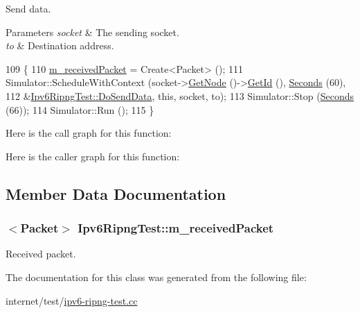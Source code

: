 Send data. 


\begin{DoxyParams}{Parameters}
{\em socket} & The sending socket. \\
\hline
{\em to} & Destination address. \\
\hline
\end{DoxyParams}

\begin{DoxyCode}
109 \{
110   \hyperlink{classIpv6RipngTest_a1fe2f673eabbd26e6fb0dd5f28ce72eb}{m\_receivedPacket} = Create<Packet> ();
111   Simulator::ScheduleWithContext (socket->\hyperlink{classns3_1_1Socket_aba642ad4301c1df47befc0aa9afa2e48}{GetNode} ()->\hyperlink{classns3_1_1Node_aaf49b64a843565ce3812326313b370ac}{GetId} (), 
      \hyperlink{group__timecivil_ga33c34b816f8ff6628e33d5c8e9713b9e}{Seconds} (60),
112                                   &\hyperlink{classIpv6RipngTest_aa42141ba9074832b8952c66a751392c4}{Ipv6RipngTest::DoSendData}, \textcolor{keyword}{this}, socket, to);
113   Simulator::Stop (\hyperlink{group__timecivil_ga33c34b816f8ff6628e33d5c8e9713b9e}{Seconds} (66));
114   Simulator::Run ();
115 \}
\end{DoxyCode}


Here is the call graph for this function\+:




Here is the caller graph for this function\+:




\subsection{Member Data Documentation}
\subsubsection[{\texorpdfstring{m\+\_\+received\+Packet}{m_receivedPacket}}]{$<${\bf Packet}$>$ Ipv6\+Ripng\+Test\+::m\+\_\+received\+Packet\hspace{0.3cm}{\ttfamily [private]}}\hypertarget{classIpv6RipngTest_a1fe2f673eabbd26e6fb0dd5f28ce72eb}{}\label{classIpv6RipngTest_a1fe2f673eabbd26e6fb0dd5f28ce72eb}


Received packet. 



The documentation for this class was generated from the following file\+:\begin{DoxyCompactItemize}
\item 
internet/test/\hyperlink{ipv6-ripng-test_8cc}{ipv6-\/ripng-\/test.\+cc}\end{DoxyCompactItemize}
